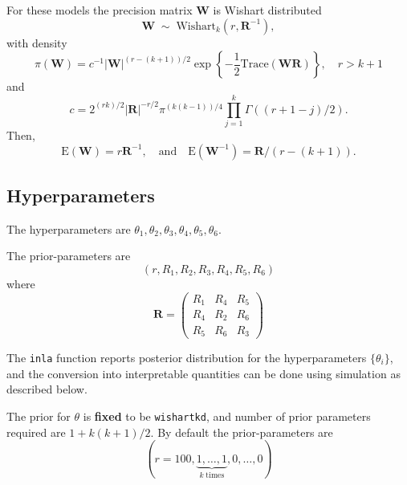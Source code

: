 \documentclass[a4paper,11pt]{article}
\begin{document}
For these models the precision matrix $\mathbf{W}$ is Wishart
distributed
\begin{displaymath}
    \mathbf{W}
    \;\sim\;\text{Wishart}_{k}(r, \mathbf{R}^{-1}), 
\end{displaymath}
with density
\begin{displaymath}
    \pi(\mathbf{W}) = c^{-1} |\mathbf{W}|^{(r-(k+1))/2} \exp\left\{
      -\frac{1}{2}\text{Trace}(\mathbf{W}\mathbf{R})\right\}, \quad r > k+1
\end{displaymath}
and
\begin{displaymath}
    c = 2^{(rk)/2} |\mathbf{R}|^{-r/2} \pi^{(k(k-1))/4}\prod_{j=1}^{k}
    \Gamma((r+1-j)/2).
\end{displaymath}
Then,
\begin{displaymath}
    \text{E}(\mathbf{W}) = r\mathbf{R}^{-1}, \quad\text{and}\quad
    \text{E}(\mathbf{W}^{-1}) = \mathbf{R}/(r-(k+1)).
\end{displaymath}

\subsection*{Hyperparameters}

The hyperparameters are
$\theta_1, \theta_2, \theta_3, \theta_4, \theta_5, \theta_6$.

The prior-parameters are
\begin{displaymath}
    (r,R_{1}, R_{2}, R_{3}, R_{4}, R_{5}, R_{6})
\end{displaymath}
where 
\begin{displaymath}
    \mathbf{R}= \left(
      \begin{array}{ccc}
        R_{1} & R_{4} & R_{5}\\
        R_{4} & R_{2} & R_{6} \\
        R_{5} & R_{6} & R_{3}
      \end{array}\right)
\end{displaymath}

The {\tt inla} function reports posterior distribution for the
hyperparameters $\{\theta_i\}$, and the conversion into interpretable
quantities can be done using simulation as described below.

The prior for $\theta$ is {\bf fixed} to be {\tt wishartkd}, and
number of prior parameters required are $1 + k(k+1)/2$. By default the
prior-parameters are
\begin{displaymath}
    (r=100, \underbrace{1, \ldots, 1}_{k\;\text{times}}, 0, \ldots, 0)
\end{displaymath}
\end{document}
